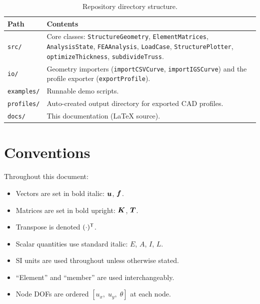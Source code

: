 \begin{table}[htbp]
\centering
\caption{Repository directory structure.}
\label{tab:layout}
\begin{tabularx}{\textwidth}{lX}
\toprule
\textbf{Path} & \textbf{Contents} \\
\midrule
\texttt{src/}       & Core classes: \texttt{StructureGeometry},
                      \texttt{ElementMatrices}, \texttt{AnalysisState},
                      \texttt{FEAAnalysis}, \texttt{LoadCase},
                      \texttt{StructurePlotter}, \texttt{optimizeThickness},
                      \texttt{subdivideTruss}. \\
\texttt{io/}        & Geometry importers (\texttt{importCSVCurve},
                      \texttt{importIGSCurve}) and the profile exporter
                      (\texttt{exportProfile}). \\
\texttt{examples/}  & Runnable demo scripts. \\
\texttt{profiles/}  & Auto-created output directory for exported CAD profiles. \\
\texttt{docs/}      & This documentation ({\LaTeX} source). \\
\bottomrule
\end{tabularx}
\end{table}

\section{Conventions}

Throughout this document:

\begin{itemize}[nosep]
    \item Vectors are set in bold italic: $\bm{u}$, $\bm{f}$.
    \item Matrices are set in bold upright: $\bm{K}$, $\bm{T}$.
    \item Transpose is denoted $(\cdot)^{\mathsf{T}}$.
    \item Scalar quantities use standard italic: $E$, $A$, $I$, $L$.
    \item SI units are used throughout unless otherwise stated.
    \item ``Element'' and ``member'' are used interchangeably.
    \item Node DOFs are ordered $[u_x,\; u_y,\; \theta]$ at each node.
\end{itemize}